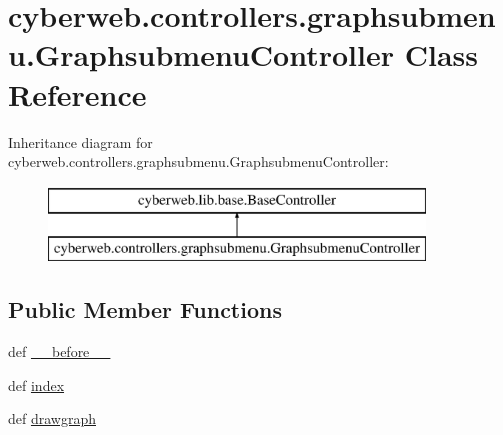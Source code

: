 \hypertarget{classcyberweb_1_1controllers_1_1graphsubmenu_1_1_graphsubmenu_controller}{\section{cyberweb.\-controllers.\-graphsubmenu.\-Graphsubmenu\-Controller \-Class \-Reference}
\label{classcyberweb_1_1controllers_1_1graphsubmenu_1_1_graphsubmenu_controller}
}
\-Inheritance diagram for cyberweb.\-controllers.\-graphsubmenu.\-Graphsubmenu\-Controller\-:\begin{figure}[H]
\begin{center}
\leavevmode
\includegraphics[height=2.000000cm]{classcyberweb_1_1controllers_1_1graphsubmenu_1_1_graphsubmenu_controller}
\end{center}
\end{figure}
\subsection*{\-Public \-Member \-Functions}
\begin{DoxyCompactItemize}
\item 
def \hyperlink{classcyberweb_1_1controllers_1_1graphsubmenu_1_1_graphsubmenu_controller_a3dc2c1404c11aefcb8dacddf452d689a}{\-\_\-\-\_\-before\-\_\-\-\_\-}
\item 
def \hyperlink{classcyberweb_1_1controllers_1_1graphsubmenu_1_1_graphsubmenu_controller_ae91652b9178a10ba6dd567cdb6274b1b}{index}
\item 
def \hyperlink{classcyberweb_1_1controllers_1_1graphsubmenu_1_1_graphsubmenu_controller_a68e7643b42a9657a6ad52bdc336759ac}{drawgraph}
\end{DoxyCompactItemize}


